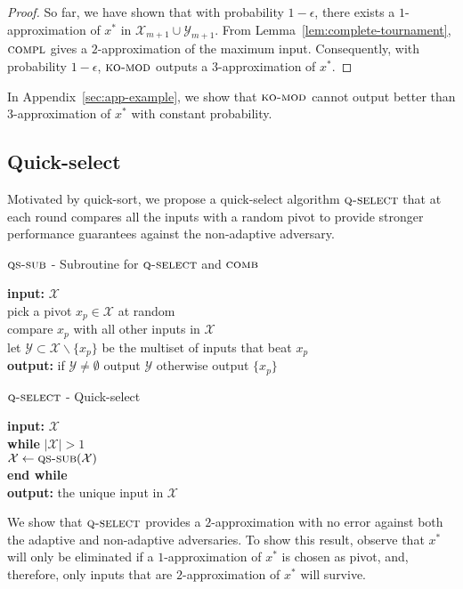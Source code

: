 \documentclass[twoside,11pt]{article}
\newcommand{\cY}{\mathcal{Y}}
\newcommand{\cX}{\mathcal{X}}
\newcommand{\algorithms}[1]{\textsc{#1}}
\newcommand{\algcomp}{\algorithms{compl}}
\newcommand{\algkomod}{\algorithms{ko-mod}}
\newcommand{\algqssub}{\algorithms{qs-sub}}
\newcommand{\algquickselect}{\algorithms{q-select}}
\newcommand{\algcomb}{\algorithms{comb}}
\newcommand{\maxx}{x^*}
\newcommand{\errorcomb}{\epsilon}
\begin{document}
\begin{proof}
So far, we have shown that with probability $1-\errorcomb$, there
exists a $1$-approximation of $\maxx$ in $\cX_{m+1}\cup\cY_{m+1}$.
From Lemma~\ref{lem:complete-tournament}, $\algcomp$ gives a
$2$-approximation of the maximum input. Consequently, with
  probability $1-\errorcomb$, $\algkomod$ outputs a $3$-approximation
  of $\maxx$.
\end{proof}

In Appendix~\ref{sec:app-example}, we show that $\algkomod$ cannot
output better than $3$-approximation of $\maxx$ with constant probability. 



\subsection{Quick-select}
\label{subsec:quickselect}
Motivated by quick-sort, we propose a quick-select algorithm $\algquickselect$ that at each round
compares all the inputs with a random
pivot to provide stronger performance guarantees against the non-adaptive adversary. 

\begin{algorithm}
\caption{$\algqssub$ - Subroutine for $\algquickselect$ and $\algcomb$}
\textbf{input:} $\cX$\\
\qquad pick a pivot $x_p\in\cX$ at random\\
\qquad compare $x_p$ with all other inputs in $\cX$\\
\qquad 	let $\cY\subset \cX\backslash\{x_p\}$ be the multiset of inputs that beat $x_p$\\
\textbf{output:} if $\cY\ne \emptyset$ output $\cY$ otherwise output $\{x_p\}$ 
\end{algorithm}
\begin{algorithm}
\caption{$\algquickselect$ - Quick-select}
\textbf{input:} $\cX$\\
\qquad \textbf{while} $|\cX|>1$\\
\qquad\qquad $\cX\leftarrow\algqssub(\cX)$\\
\qquad \textbf{end while}\\
\textbf{output:} the unique input in $\cX$
\end{algorithm}

We show that $\algquickselect$ provides a $2$-approximation with no
error against both the adaptive and non-adaptive adversaries. To show this result, observe that $\maxx$ will only be eliminated if a $1$-approximation of $\maxx$ is chosen as pivot, and, therefore, only inputs that are $2$-approximation of $\maxx$ will survive.
\end{document}
